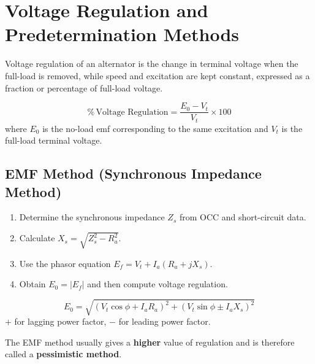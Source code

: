 \documentclass[12pt,a4paper]{article}
\newcommand{\Vt}{V_t}
\newcommand{\Ef}{E_f}
\newcommand{\Ia}{I_a}
\newcommand{\Ra}{R_a}
\begin{document}
\section{Voltage Regulation and Predetermination Methods}

\begin{definebox}
Voltage regulation of an alternator is the change in terminal voltage when the full-load is removed, while speed and excitation are kept constant, expressed as a fraction or percentage of full-load voltage.
\end{definebox}

\begin{formulabox}
\[
  \%\,\text{Voltage Regulation}
  =
  \frac{E_0 - \Vt}{\Vt}\times 100
\]
where \(E_0\) is the no-load emf corresponding to the same excitation and \(\Vt\) is the full-load terminal voltage.
\end{formulabox}

\subsection{EMF Method (Synchronous Impedance Method)}

\begin{studybox}[Procedure]
\begin{enumerate}[leftmargin=*, label=\textcolor{anthOrange}{\HeadingFont\bfseries\arabic*.}]
  \item Determine the synchronous impedance \(Z_s\) from OCC and short-circuit data.
  \item Calculate \(X_s = \sqrt{Z_s^2 - \Ra^2}\).
  \item Use the phasor equation \(\Ef = \Vt + \Ia(\Ra + jX_s)\).
  \item Obtain \(E_0 = |\Ef|\) and then compute voltage regulation.
\end{enumerate}
\end{studybox}

\begin{formulabox}
\[
  E_0
  =
  \sqrt{\left(\Vt\cos\phi + \Ia\Ra\right)^2
       +
       \left(\Vt\sin\phi \pm \Ia X_s\right)^2}
\]
\(+\) for lagging power factor, \(-\) for leading power factor.
\end{formulabox}

\begin{notebox}
The EMF method usually gives a \textbf{higher} value of regulation and is therefore called a \textbf{pessimistic method}.
\end{notebox}
\end{document}

